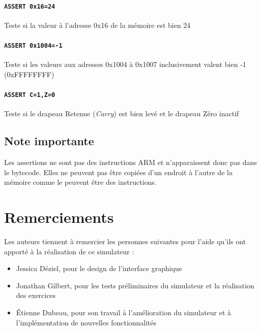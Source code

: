 \documentclass{tufte-handout}
\begin{document}
\paragraph{\texttt{ASSERT 0x16=24}} Teste si la valeur à l'adresse 0x16 de la mémoire est bien 24

\paragraph{\texttt{ASSERT 0x1004=-1}} Teste si les valeurs aux adresses 0x1004 à 0x1007 inclusivement valent bien -1 (0xFFFFFFFF)

\paragraph{\texttt{ASSERT C=1,Z=0}} Teste si le drapeau Retenue (\textit{Carry}) est bien levé et le drapeau Zéro inactif


\subsection{Note importante}

Les assertions ne sont pas des instructions ARM et n'apparaissent donc pas dans le bytecode. Elles ne peuvent pas être copiées d'un endroit à l'autre de la mémoire comme le peuvent être des instructions.

\clearpage
\section{Remerciements}

Les auteurs tiennent à remercier les personnes suivantes pour l'aide qu'ils ont apporté à la réalisation de ce simulateur :
\begin{itemize}
	\item Jessica Déziel, pour le design de l'interface graphique
	\item Jonathan Gilbert, pour les tests préliminaires du simulateur et la réalisation des exercices
	\item Étienne Dubeau, pour son travail à l'amélioration du simulateur et à l'implémentation de nouvelles fonctionnalités
\end{itemize}
\end{document}
